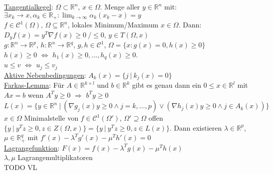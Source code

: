 \documentclass[a4paper]{article}
\newcommand{\ul}{\underline}
\begin{document}
\ul{Tangentialkegel}: $\Omega\subset\mathbb{R}^n$, $x\in\Omega$. Menge aller $y\in\mathbb{R}^n$ mit: $\exists x_k\rightarrow x,\alpha_k\in\mathbb{R}_+:\lim_{k\rightarrow\infty}\alpha_k(x_k-x)=y$\\
$f\in\mathcal{C}^1(\Omega)$, $\Omega\subseteq\mathbb{R}^n$, lokales Minimum/Maximum $x\in\Omega$. Dann: $D_yf(x)=y^T\nabla f(x)\geq 0\ / \leq 0$, $y\in T(\Omega,x)$\\
$g:\mathbb{R}^n\rightarrow\mathbb{R}^p$, $h:\mathbb{R}^n\rightarrow\mathbb{R}^q$, $g,h\in\mathcal{C}^1$, $\Omega=\{x:g(x)=0,h(x)\geq 0\}$\\
$h(x)\geq 0$ $\Leftrightarrow$ $h_1(x)\geq 0,\dots,h_q(x)\geq 0$.\\
$u\leq v$ $\Leftrightarrow$ $u_j\leq v_j$\\
\ul{Aktive Nebenbedingungen}: $A_k(x)=\{j\ \vert\ k_j(x)=0\}$\\
\ul{Farkas-Lemma}: Für $A\in\mathbb{R}^{k\times l}$ und $b\in\mathbb{R}^k$ gibt es genau dann ein $0\leq x\in\mathbb{R}^l$ mit $Ax=b$ wenn $A^Ty\geq 0$ $\Rightarrow$ $b^Ty\geq 0$\\
$L(x)=\{y\in\mathbb{R}^n\ \vert\ (\nabla g_j(x)y\geq 0 \wedge j=k,\dots,p)\vee(\nabla h_j(x)y\geq 0\wedge j\in A_k(x))\}$\\
$x\in\Omega$ Minimalstelle von $f\in\mathcal{C}^1(\Omega')$, $\Omega'\supseteq\Omega$ offen $\{y\ \vert\ y^Tz\geq 0,z\in Z(\Omega,x)\}=\{y\ \vert\ y^Tz\geq 0,z\in L(x)\}$. Dann existieren $\lambda\in\mathbb{R}^p$, $\mu\in\mathbb{R}_+^q$ mit $f'(x)-\lambda^Tg'(x)-\mu^Th'(x)=0$\\
\ul{Lagrangefunktion}: $F(x)=f(x)-\lambda^Tg(x)-\mu^Th(x)$\\
$\lambda,\mu$ Lagrangemultiplikatoren\\
TODO VL\\
\end{document}
